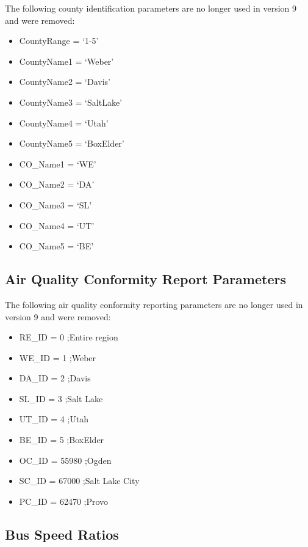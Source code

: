 \documentclass[
  letterpaper,
  DIV=11,
  numbers=noendperiod,
  titlepage=false]{scrreprt}
\providecommand{\tightlist}{%
  \setlength{\itemsep}{0pt}\setlength{\parskip}{0pt}}\usepackage{longtable,booktabs,array}
\begin{document}
The following county identification parameters are no longer used in
version 9 and were removed:

\begin{itemize}
\tightlist
\item
  CountyRange = `1-5'
\item
  CountyName1 = `Weber'
\item
  CountyName2 = `Davis'
\item
  CountyName3 = `SaltLake'
\item
  CountyName4 = `Utah'
\item
  CountyName5 = `BoxElder'
\item
  CO\_Name1 = `WE'
\item
  CO\_Name2 = `DA'
\item
  CO\_Name3 = `SL'
\item
  CO\_Name4 = `UT'
\item
  CO\_Name5 = `BE'
\end{itemize}

\hypertarget{air-quality-conformity-report-parameters}{%
\subsection{Air Quality Conformity Report
Parameters}\label{air-quality-conformity-report-parameters}}

The following air quality conformity reporting parameters are no longer
used in version 9 and were removed:

\begin{itemize}
\tightlist
\item
  RE\_ID = 0 ;Entire region
\item
  WE\_ID = 1 ;Weber
\item
  DA\_ID = 2 ;Davis
\item
  SL\_ID = 3 ;Salt Lake
\item
  UT\_ID = 4 ;Utah
\item
  BE\_ID = 5 ;BoxElder
\item
  OC\_ID = 55980 ;Ogden
\item
  SC\_ID = 67000 ;Salt Lake City
\item
  PC\_ID = 62470 ;Provo
\end{itemize}

\hypertarget{bus-speed-ratios}{%
\subsection{Bus Speed Ratios}\label{bus-speed-ratios}}
\end{document}
